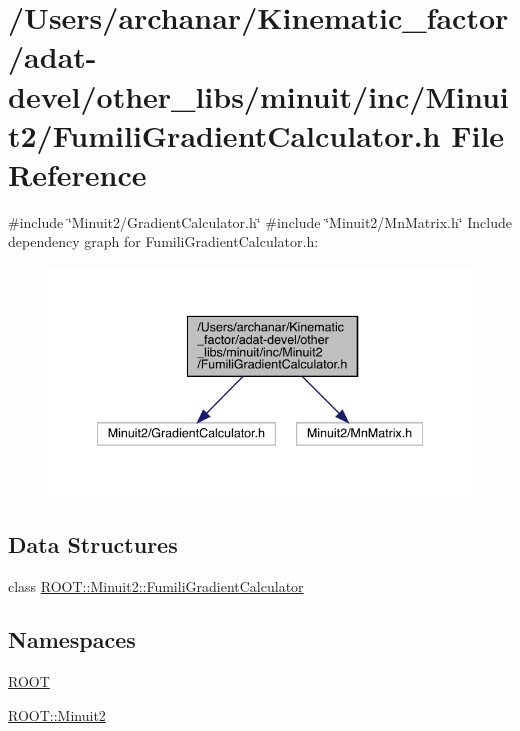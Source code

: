 \hypertarget{adat-devel_2other__libs_2minuit_2inc_2Minuit2_2FumiliGradientCalculator_8h}{}\section{/\+Users/archanar/\+Kinematic\+\_\+factor/adat-\/devel/other\+\_\+libs/minuit/inc/\+Minuit2/\+Fumili\+Gradient\+Calculator.h File Reference}
\label{adat-devel_2other__libs_2minuit_2inc_2Minuit2_2FumiliGradientCalculator_8h}
{\ttfamily \#include \char`\"{}Minuit2/\+Gradient\+Calculator.\+h\char`\"{}}\newline
{\ttfamily \#include \char`\"{}Minuit2/\+Mn\+Matrix.\+h\char`\"{}}\newline
Include dependency graph for Fumili\+Gradient\+Calculator.\+h\+:
\nopagebreak
\begin{figure}[H]
\begin{center}
\leavevmode
\includegraphics[width=340pt]{d2/dbc/adat-devel_2other__libs_2minuit_2inc_2Minuit2_2FumiliGradientCalculator_8h__incl}
\end{center}
\end{figure}
\subsection*{Data Structures}
\begin{DoxyCompactItemize}
\item 
class \mbox{\hyperlink{classROOT_1_1Minuit2_1_1FumiliGradientCalculator}{R\+O\+O\+T\+::\+Minuit2\+::\+Fumili\+Gradient\+Calculator}}
\end{DoxyCompactItemize}
\subsection*{Namespaces}
\begin{DoxyCompactItemize}
\item 
 \mbox{\hyperlink{namespaceROOT}{R\+O\+OT}}
\item 
 \mbox{\hyperlink{namespaceROOT_1_1Minuit2}{R\+O\+O\+T\+::\+Minuit2}}
\end{DoxyCompactItemize}

